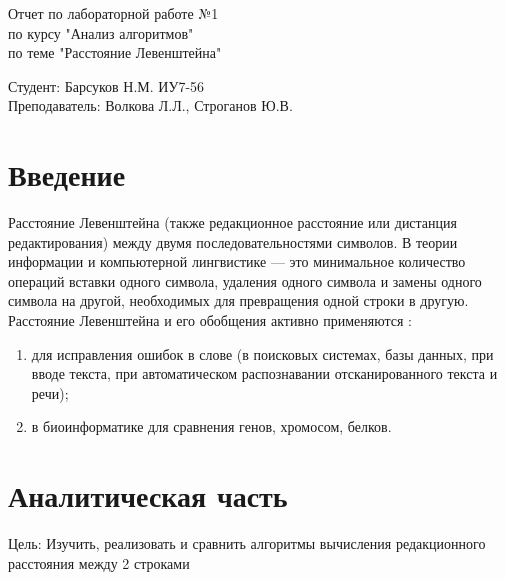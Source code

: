 \documentclass[a4paper, 14pt]{article}
\begin{document}
	\begin{titlepage}
		\begin{center}
			\begin{LARGE}
				Отчет по лабораторной работе №1\\
				по курсу "Анализ алгоритмов"\\
				по теме "Расстояние Левенштейна"
			\end{LARGE}
			
			\begin{Large}
				\vspace{10cm}
				Студент: Барсуков Н.М. ИУ7-56\\
				Преподаватель: Волкова Л.Л.,
				Строганов Ю.В.
			\end{Large}
		\end{center}
	\end{titlepage}

	\tableofcontents
	
	\newpage
	\section*{Введение}
	
	Расстояние Левенштейна (также редакционное расстояние или дистанция редактирования) между двумя последовательностями символов.  В теории информации и компьютерной лингвистике — это минимальное количество операций вставки одного символа, удаления одного символа и замены одного символа на другой, необходимых для превращения одной строки в другую.\\
	
	Расстояние Левенштейна и его обобщения активно применяются \cite{primenenie}:
	
	\begin{enumerate}
		\item для исправления ошибок в слове (в поисковых системах, базы данных, при вводе текста, при автоматическом распознавании отсканированного текста и речи);
		\item в биоинформатике для сравнения генов, хромосом, белков.
	\end{enumerate}
	
	\newpage
	\section{Аналитическая часть}
	
	Цель: Изучить, реализовать и сравнить алгоритмы вычисления редакционного расстояния между 2 строками
	
\end{document}
